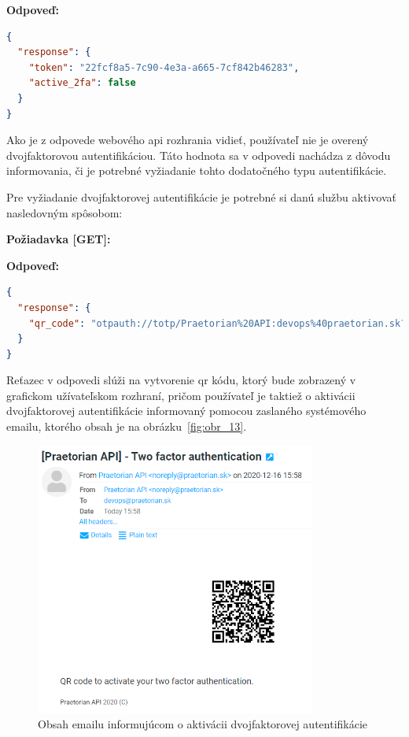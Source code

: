 \textbf{\large Odpoveď:}

\begin{lstlisting}[language=json,firstnumber=1]
{
  "response": {
    "token": "22fcf8a5-7c90-4e3a-a665-7cf842b46283",
    "active_2fa": false
  }
}
\end{lstlisting}

Ako je z odpovede webového api rozhrania vidieť, používateľ nie je overený dvojfaktorovou autentifikáciou.
Táto hodnota sa v odpovedi nachádza z dôvodu informovania, či je potrebné vyžiadanie tohto dodatočného typu autentifikácie.

Pre vyžiadanie dvojfaktorovej autentifikácie je potrebné si danú službu aktivovať nasledovným spôsobom:

\textbf{\large Požiadavka [GET]:}


\newpage
\textbf{\large Odpoveď:}

\begin{lstlisting}[language=json,firstnumber=1]
{
  "response": {
    "qr_code": "otpauth://totp/Praetorian%20API:devops%40praetorian.sk?secret=J4UZONZ36IQGLZAM&issuer=Praetorian%20API"
  }
}
\end{lstlisting}

Reťazec v odpovedi slúži na vytvorenie qr kódu, ktorý bude zobrazený v grafickom užívateľskom rozhraní, pričom používateľ
je taktiež o aktivácii dvojfaktorovej autentifikácie informovaný pomocou zaslaného systémového emailu, ktorého obsah
je na obrázku~\ref{fig:obr_13}.

\begin{figure}[H]
\begin{center}\includegraphics[width=\textwidth,height=9cm,keepaspectratio=true]{assets/2fa_email.png}\end{center}
\caption[Obsah emailu informujúcom o aktivácii dvojfaktorovej autentifikácie]{Obsah emailu informujúcom o aktivácii dvojfaktorovej autentifikácie}\label{fig:obr_14}
\end{figure}

